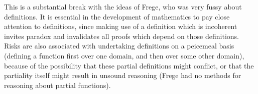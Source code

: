 This is a substantial break with the ideas of Frege, who was very
fussy about definitions.
It is essential in the development of mathematics to pay close
attention to definitions, since making use of a definition which is
incoherent invites paradox and invalidates all proofs which depend on
those definitions.
Risks are also associated with undertaking definitions on a peicemeal
basis (defining a function first over one domain, and then over some
other domain), because of the possibility that these partial
definitions might conflict, or that the partiality itself might result
in unsound reasoning (Frege had no methods for reasoning about partial functions).


